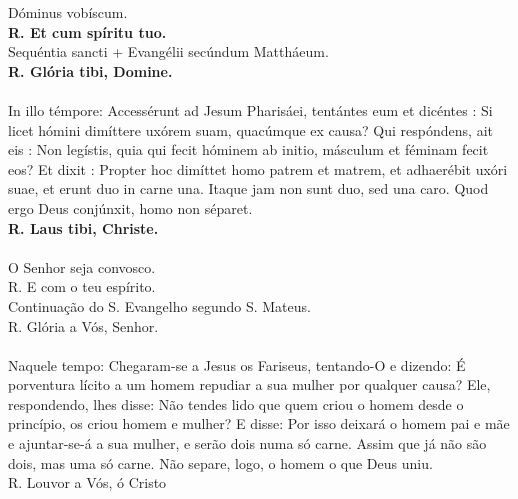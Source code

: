 \begin{multicols}{2}
	\noindent
Dóminus vobíscum.
\\\textbf{R. Et cum spíritu tuo.}
\\Sequéntia sancti + Evangélii secúndum Mattháeum.
\\\textbf{R. Glória tibi, Domine.}
\\
\\ In illo témpore: Accessérunt ad Jesum Pharisáei, tentántes eum et dicéntes : Si  licet hómini dimíttere uxórem suam, quacúmque ex causa? Qui respóndens, ait eis : Non legístis, quia qui fecit hóminem ab initio, másculum et féminam fecit eos? Et dixit : Propter hoc dimíttet homo patrem et matrem, et adhaerébit uxóri suae, et erunt duo in carne una. Itaque jam non sunt duo, sed una caro. Quod ergo Deus conjúnxit, homo non séparet.
\\\textbf{R. Laus tibi, Christe. }
\\
\\O Senhor seja convosco.
\\R. E com o teu espírito. 
\\Continuação do S. Evangelho segundo S. Mateus.
\\R. Glória a Vós, Senhor.
\\
\\Naquele tempo: Chegaram-se a Jesus os Fariseus, tentando-O e dizendo: É porventura lícito a um homem repudiar a sua mulher por qualquer causa? Ele, respondendo, lhes disse: Não tendes lido que quem criou o homem desde o princípio, os criou homem e mulher? E disse: Por isso deixará o homem pai e mãe e ajuntar-se-á a sua mulher, e serão dois numa só carne. Assim que já não são dois, mas uma só carne. Não separe, logo, o homem o que Deus uniu.
\\R. Louvor a Vós, ó Cristo
\end{multicols}

